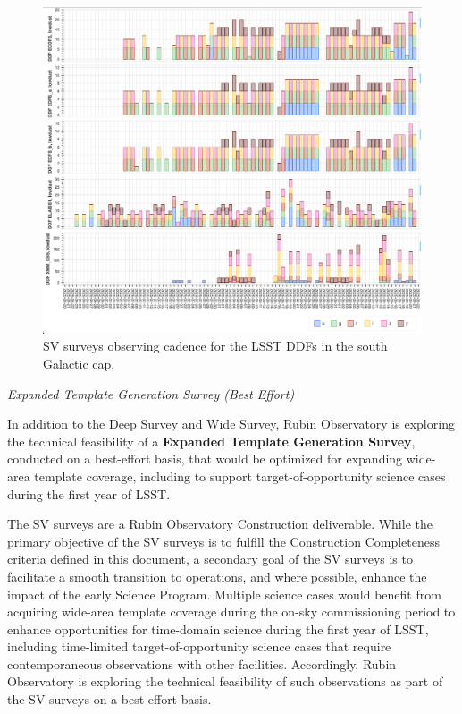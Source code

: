 \begin{figure}[htbp]
    \begin{center}
    \includegraphics[width=1\textwidth]{./sv_surveys_ddf_cadence.png}
    \caption{SV surveys observing cadence for the LSST DDFs in the south Galactic cap.}
    \label{sv_surveys_ddf_cadence}
    \end{center}
\end{figure}


\textit{Expanded Template Generation Survey (Best Effort)}

In addition to the Deep Survey and Wide Survey, Rubin Observatory is exploring the technical feasibility of a \textbf{Expanded Template Generation Survey}, conducted on a best-effort basis, that would be optimized for expanding wide-area template coverage, including to support target-of-opportunity science cases during the first year of LSST.

The SV surveys are a Rubin Observatory Construction deliverable.
While the primary objective of the SV surveys is to fulfill the Construction Completeness criteria defined in this document, a secondary goal of the SV surveys is to facilitate a smooth transition to operations, and where possible, enhance the impact of the early Science Program.
Multiple science cases would benefit from acquiring wide-area template coverage during the on-sky commissioning period to enhance opportunities for time-domain science during the first year of LSST, including time-limited target-of-opportunity science cases that require contemporaneous observations with other facilities.
Accordingly, Rubin Observatory is exploring the technical feasibility of such observations as part of the SV surveys on a best-effort basis.

